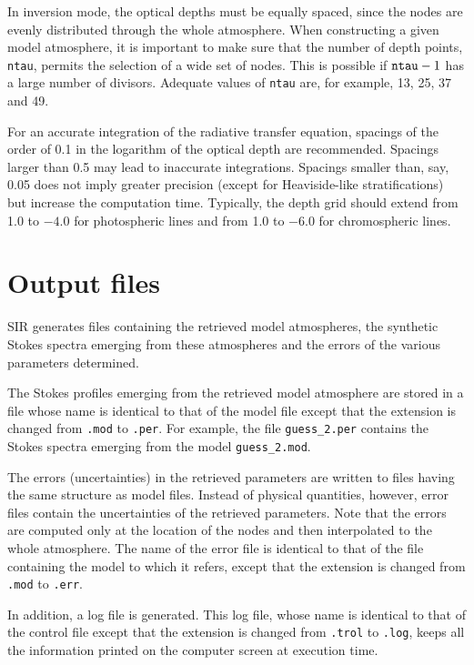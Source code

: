 \documentclass[11pt]{report}
\begin{document}
In inversion mode, the optical depths must be equally spaced, since the
nodes are evenly distributed through the whole atmosphere. When
constructing a given model atmosphere, it is important to make sure
that the number of depth points, {\tt ntau}, permits the selection of a
wide set of nodes. This is possible if ${\tt ntau} -1$ has a large
number of divisors. Adequate values of {\tt ntau} are, for example, 13,
25, 37 and 49.

For an accurate integration of the radiative transfer equation,
spacings of the order of 0.1 in the logarithm of the optical depth are
recommended. Spacings larger than 0.5 may lead to inaccurate
integrations. Spacings smaller than, say, 0.05 does not imply greater
precision (except for Heaviside-like stratifications) but increase the
computation time.  Typically, the depth grid should extend from 1.0 to
$-4.0$ for photospheric lines and from 1.0 to $-6.0$ for chromospheric
lines.


\section{Output files}
SIR generates files containing the retrieved model atmospheres, the
synthetic Stokes spectra emerging from these atmospheres and the
errors of the various parameters determined. 

The Stokes profiles emerging from the retrieved model atmosphere
are stored in a file whose name is identical to that of the model 
file except that the extension is changed from
{\tt .mod} to {\tt .per}. For example, the file {\tt guess\_2.per}
contains the Stokes spectra emerging from the model {\tt guess\_2.mod}.

The errors (uncertainties) in the retrieved parameters are
written to files having the same structure as model files. 
Instead of physical quantities, however, error files contain the 
uncertainties of the retrieved parameters. Note that the 
errors are computed only at the location of the nodes and
then interpolated to the whole atmosphere. The name of
the error file is identical to that of the file containing
the model to which it refers, except that the extension is
changed from {\tt .mod} to {\tt .err}. 

In addition, a log file is generated. This log file, whose
name is identical to that of the control file except that the
extension is changed from {\tt .trol} to {\tt .log}, keeps
all the information printed on the computer screen at execution
time. 
\end{document}
